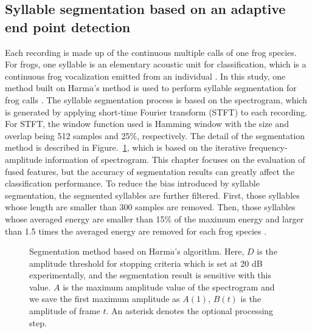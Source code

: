 \subsection{Syllable segmentation based on an adaptive end point detection}
Each recording is made up of the continuous multiple calls of one frog species. For frogs, one syllable is an elementary acoustic unit for classification, which is a continuous frog vocalization emitted from an individual \citep{huang2009frog}. In this study, one method built on H$\ddot{a}$rm$\ddot{a}$'s method is used to perform syllable segmentation for frog calls \citep{harma2003automatic}. The syllable segmentation process is based on the spectrogram, which is generated by applying short-time Fourier transform (STFT) to each recording. For STFT, the window function used is Hamming window with the size and overlap being 512 samples and 25\%, respectively. The detail of the segmentation method is described in Figure.~\ref{fig:segmentation}, which is based on the iterative frequency-amplitude information of spectrogram. This chapter focuses on the evaluation of fused features, but the accuracy of segmentation results can greatly affect the classification performance. To reduce the bias introduced by syllable segmentation, the segmented syllables are further filtered. First, those syllables whose length are smaller than 300 samples are removed. Then, those syllables whose averaged energy are smaller than 15\% of the maximum energy and larger than 1.5 times the averaged energy are removed for each frog species \citep{Gingras2013}.   


\begin{figure}[htb!] %
\caption[H$\ddot{a}$rm$\ddot{a}$'s segmentation algorithm]{Segmentation method based on H$\ddot{a}$rm$\ddot{a}$'s algorithm. Here, $D$ is the amplitude threshold for stopping criteria which is set at 20 dB experimentally, and the segmentation result is sensitive with this value. $A$ is the maximum amplitude value of the spectrogram and we save the first maximum amplitude as $A(1)$, $B(t)$ is the amplitude of frame $t$. An asterisk denotes the optional processing step.}
\label{fig:segmentation} 
\end{figure}



